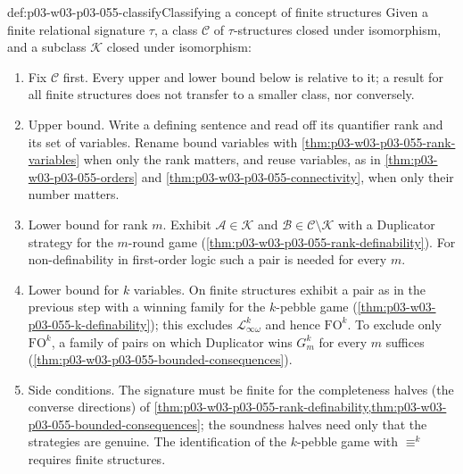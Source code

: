 \begin{hbmethod}{def:p03-w03-p03-055-classify}{Classifying a concept of finite structures}
Given a finite relational signature \(\tau\), a class \(\mathcal C\) of
\(\tau\)-structures closed under isomorphism, and a subclass
\(\mathcal K\) closed under isomorphism:
\begin{enumerate}
\item Fix \(\mathcal C\) first. Every upper and lower bound below is
      relative to it; a result for all finite structures does not transfer
      to a smaller class, nor conversely.
\item Upper bound. Write a defining sentence and read off its quantifier
      rank and its set of variables. Rename bound variables with
      \cref{thm:p03-w03-p03-055-rank-variables} when only the rank matters,
      and reuse variables, as in \cref{thm:p03-w03-p03-055-orders} and
      \cref{thm:p03-w03-p03-055-connectivity}, when only their number
      matters.
\item Lower bound for rank \(m\). Exhibit \(\mathcal A\in\mathcal K\) and
      \(\mathcal B\in\mathcal C\setminus\mathcal K\) with a Duplicator
      strategy for the \(m\)-round game
      (\cref{thm:p03-w03-p03-055-rank-definability}). For non-definability
      in first-order logic such a pair is needed for every \(m\).
\item Lower bound for \(k\) variables. On finite structures exhibit a pair
      as in the previous step with a winning family for the \(k\)-pebble
      game (\cref{thm:p03-w03-p03-055-k-definability}); this excludes
      \(\mathcal L^k_{\infty\omega}\) and hence \(\mathrm{FO}^k\). To
      exclude only \(\mathrm{FO}^k\), a family of pairs on which Duplicator
      wins \(G^k_m\) for every \(m\) suffices
      (\cref{thm:p03-w03-p03-055-bounded-consequences}).
\item Side conditions. The signature must be finite for the completeness
      halves (the converse directions) of
      \cref{thm:p03-w03-p03-055-rank-definability,thm:p03-w03-p03-055-bounded-consequences};
      the soundness halves need only that the strategies are genuine. The
      identification of the \(k\)-pebble game with \(\equiv^k\) requires
      finite structures.
\end{enumerate}
\end{hbmethod}


